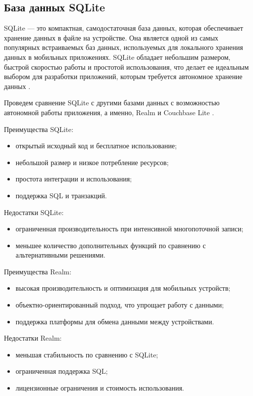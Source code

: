 \subsection{База данных SQLite}
SQLite — это компактная, самодостаточная база данных, которая обеспечивает хранение данных в файле на устройстве. Она является одной из самых популярных встраиваемых баз данных, используемых для локального хранения данных в мобильных приложениях. SQLite обладает небольшим размером, быстрой скоростью работы и простотой использования, что делает ее идеальным выбором для разработки приложений, которым требуется автономное хранение данных \cite{SQLite}. 

Проведем сравнение SQLite с другими базами данных с возможностью автономной работы приложения, а именно, Realm \cite{Realm} и Couchbase Lite \cite{Couchbase}.

Преимущества SQLite:
\begin{itemize}
        \item открытый исходный код и бесплатное использование;
        \item небольшой размер и низкое потребление ресурсов;
        \item простота интеграции и использования;
        \item поддержка SQL и транзакций.
    \end{itemize}

Недостатки SQLite:
\begin{itemize}
        \item ограниченная производительность при интенсивной многопоточной записи;
        \item меньшее количество дополнительных функций по сравнению с альтернативными решениями.
    \end{itemize}


Преимущества Realm:
\begin{itemize}
        \item высокая производительность и оптимизация для мобильных устройств;
        \item объектно-ориентированный подход, что упрощает работу с данными;
        \item поддержка платформы для обмена данными между устройствами.
    \end{itemize}

Недостатки Realm:
\begin{itemize}
        \item меньшая стабильность по сравнению с SQLite;
        \item ограниченная поддержка SQL;
        \item лицензионные ограничения и стоимость использования.
    \end{itemize}

